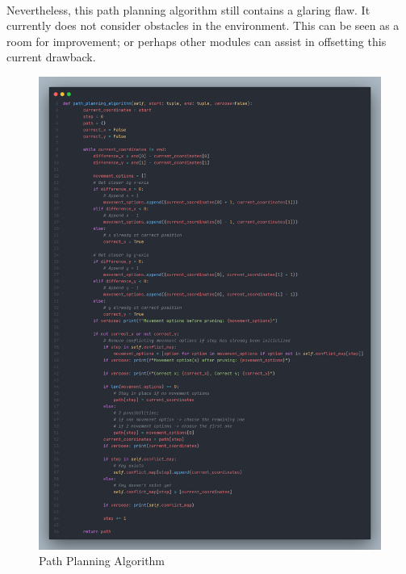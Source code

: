 \paragraph*{}
Nevertheless, this path planning algorithm still contains a glaring flaw. It currently does not consider obstacles in the environment. This can be seen as a room for improvement; or perhaps other modules can assist in offsetting this current drawback.

\begin{figure}
    \centering
    \includegraphics[width=1\linewidth]{assets/images/formation/path_planning_algorithm.png}
    \caption{Path Planning Algorithm}
    \label{fig:formation_path_planning_algorithm}
\end{figure}
